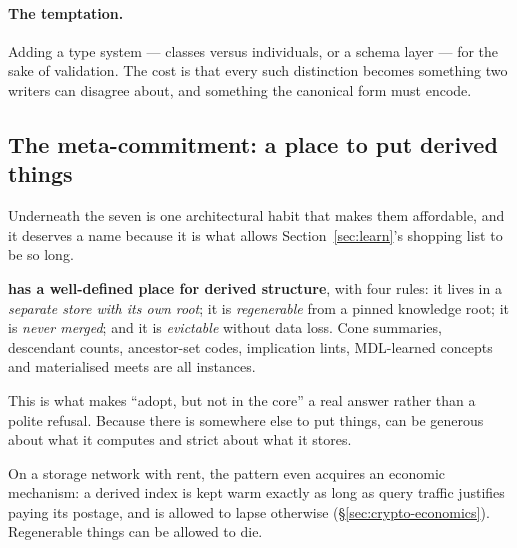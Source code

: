 \paragraph{The temptation.} Adding a type system --- classes versus
individuals, or a schema layer --- for the sake of validation. The cost is
that every such distinction becomes something two writers can disagree about,
and something the canonical form must encode.

\subsection{The meta-commitment: a place to put derived things}

Underneath the seven is one architectural habit that makes them affordable,
and it deserves a name because it is what allows Section~\ref{sec:learn}'s
shopping list to be so long.

\begin{keyidea}
\textbf{\odag{} has a well-defined place for derived structure}, with four
rules: it lives in a \emph{separate store with its own root}; it is
\emph{regenerable} from a pinned knowledge root; it is \emph{never merged};
and it is \emph{evictable} without data loss. Cone summaries, descendant
counts, ancestor-set codes, implication lints, MDL-learned concepts and
materialised meets are all instances.

This is what makes ``adopt, but not in the core'' a real answer rather than a
polite refusal. Because there is somewhere else to put things, \odag{} can be
generous about what it computes and strict about what it stores.
\end{keyidea}

On a storage network with rent, the pattern even acquires an economic
mechanism: a derived index is kept warm exactly as long as query traffic
justifies paying its postage, and is allowed to lapse otherwise
(\S\ref{sec:crypto-economics}). Regenerable things can be allowed to die.
